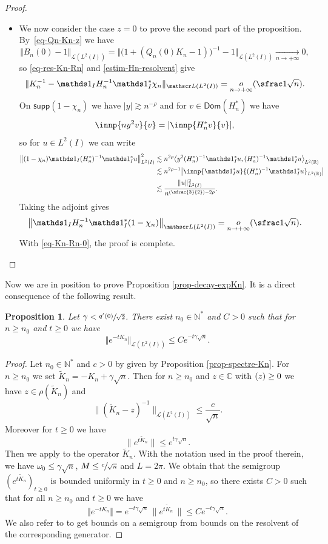 \documentclass[JEP,XML,SOM,Unicode]{cedram}
\let\mathcal\mathscr
\newcommand{\Psfrac}[2]{(\sfrac{#1}{#2})}
\theoremstyle{plain}
\newtheorem{proposition}[theorem]{Proposition}
\theoremstyle{definition}
\newcommand {\limt}[2]{\xrightarrow[#1 \to #2]{}}
\newcommand{\abs}[1]{\vert #1\vert}
\newcommand{\babs}[1]{\bigl\vert #1\bigr\vert}
\newcommand{\nr}[1]{\Vert #1\Vert}
\newcommand{\bnr}[1]{\bigl\Vert #1\bigr\Vert}
\newcommand{\binnp}[2]{\bigl\langle #1 , #2 \bigr\rangle}
\newcommand{\inv}{^{-1}}
\newcommand{\littleo}[2]{\mathop{o}\limits_{#1 \to #2}}
\newcommand{\1}{\mathds 1}
\let\Re\relax
\DeclareMathOperator{\Re}{\mathsf{Re}\mkern2mu}
\let\Im\relax
\DeclareMathOperator{\Im}{\mathsf{Im}\mkern2mu}
\newcommand{\supp}{\mathsf{supp}}
\newcommand{\Dom}{\mathsf{Dom}}
\newcommand{\R}{\mathbb{R}}
\def\C{\mathbb{C}}
\newcommand{\N}{\mathbb{N}}
\let\g\gamma
\let\h\chi
\let\o\omega
\newcommand{\Lc}{{\mathcal L}}
\begin{document}
\begin{proof}
\begin{itemize}
\item
We now consider the case $z = 0$ to prove the second part of the proposition. By~\eqref{eq-Qn-Kn-z} we have
\[
\nr{B_n(0) - 1}_{\Lc(L^2(I))} = \bnr{ \bigl(1 + (Q_n(0) K_n-1) \bigr)\inv - 1}_{\Lc(L^2(I))} \limt n {+\infty} 0,
\]
so \eqref{eq-res-Kn-Rn} and \eqref{estim-Hn-resolvent} give
\begin{equation} \label{eq-Kn-Rn-0}
\nr{K_n\inv - \1_I H_n\inv \1_I^* \h_n}_{\Lc(L^2(I))} = \littleo n {+\infty}(\sfrac 1 {\sqrt n}).
\end{equation}
On $\supp(1-\chi_n)$ we have $\abs y \gtrsim n^{-\rho}$ and for $v \in \Dom(H_n^*)$ we have
\[
\innp{n y^2 v}{v} = \abs{\Im\innp{H_n^* v}{v}},
\]
so for $u \in L^2(I)$ we can write
\begin{align*}
\bnr{(1-\chi_n) \1_I (H_n^*)\inv \1_I^* u}^2_{L^2(I)}
& \lesssim n^{2\rho} \binnp{y^2 (H_n^*)\inv \1_I^*u}{(H_n^*)\inv \1_I^*u}_{L^2(\R)} \\
& \lesssim n^{2\rho - 1} \babs{\Im \innp{\1_I^* u}{(H_n^*)\inv \1_I^* u}_{L^2(\R)}} \\
& \lesssim \frac {\nr u^2_{L^2(I)}}{n^{\Psfrac 32 - 2\rho}}.
\end{align*}
Taking the adjoint gives
\[
\bnr{\1_I H_n\inv \1_I^* (1-\chi_n)}_{\Lc(L^2(I))} = \littleo n {+\infty}(\sfrac 1 {\sqrt n}).
\]
With \eqref{eq-Kn-Rn-0}, the proof is complete.\qedhere
\end{itemize}
\end{proof}

Now we are in position to prove Proposition \ref{prop-decay-expKn}. It is a direct consequence of the following result.

\begin{proposition} \label{prop-exp-Kn}
Let $\gamma < \sfrac {q'(0)}{\sqrt 2}$. There exist $n_0 \in \N^*$ and $C > 0$ such that for $n \geq n_0$ and $t \geq 0$ we have
\[
\nr{e^{-tK_n}}_{\Lc(L^2(I))} \leq C e^{-t\gamma \sqrt n}.
\]
\end{proposition}

\begin{proof}
Let $n_0 \in \N^*$ and $c > 0$ by given by Proposition \ref{prop-spectre-Kn}. For $n \geq n_0$ we set $\tilde K_n = -K_n + \g \sqrt n$. Then for $n \geq n_0$ and $z \in \C$ with $\Re(z) \geq 0$ we have $z \in \rho(\tilde K_n)$ and
\[
\big\| (\tilde K_n - z)\inv \big\|_{\Lc(L^2(I))} \leq \frac {c}{\sqrt n}.
\]
Moreover for $t \geq 0$ we have
\[
\bigl\|e^{t \tilde K_n} \bigr\| \leq e^{t\g \sqrt n}.
\]
Then we apply \cite[Th. V.1.11 p. 302]{engel} to the operator $\tilde K_n$. With the notation used in the proof therein, we have $\o_0 \leq \g \sqrt n$, $M\leq \sfrac c {\sqrt n}$ and $L= 2\pi$. We obtain that the semigroup $(e^{t\tilde K_n})_{t \geq 0}$ is bounded uniformly in $t \geq 0$ and $n \geq n_0$, so there exists $C > 0$ such that for all $n \geq n_0$ and $t \geq 0$ we have
\[
\nr{e^{-tK_n}} = e^{-t\g \sqrt n}\, \bigl \| e^{t\tilde K_n}\, \bigr \| \leq C e^{-t\g \sqrt n}.
\]
We also refer to \cite{HelfferSjo10} to get bounds on a semigroup from bounds on the resolvent of the corresponding generator.
\end{proof}
\end{document}
